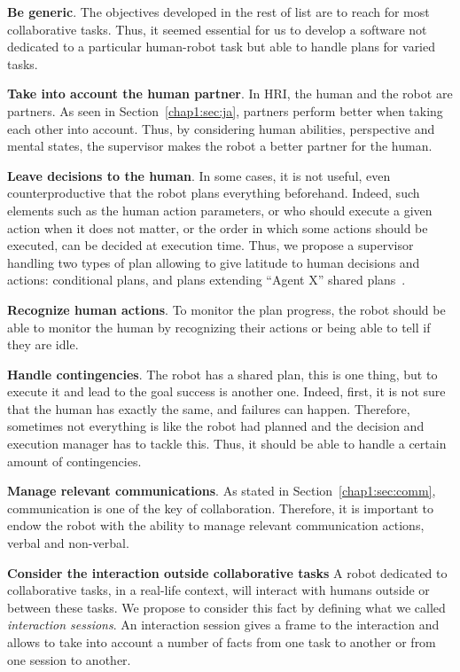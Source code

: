 \documentclass[a4paper,11pt,twoside]{StyleThese}
\begin{document}
\begin{bulletList}
	\item \textbf{Be generic}. The objectives developed in the rest of list are to reach for most collaborative tasks. Thus, it seemed essential for us to develop a software not dedicated to a particular human-robot task but able to handle plans for varied tasks. 
	\item \textbf{Take into account the human partner}. In HRI, the human and the robot are partners. As seen in Section~\ref{chap1:sec:ja}, partners perform better when taking each other into account. Thus, by considering human abilities, perspective and mental states, the supervisor makes the robot a better partner for the human.
	\item \textbf{Leave decisions to the human}. In some cases, it is not useful, even counterproductive that the robot plans everything beforehand. Indeed, such elements such as the human action parameters, or who should execute a given action when it does not matter, or the order in which some actions should be executed, can be decided at execution time. Thus, we propose a supervisor handling two types of plan allowing to give latitude to human decisions and actions: conditional plans, and plans extending ``Agent X'' shared plans~\cite{devin_2017_decisions}.
	\item \textbf{Recognize human actions}. To monitor the plan progress, the robot should be able to monitor the human by recognizing their actions or being able to tell if they are idle.
	\item \textbf{Handle contingencies}. The robot has a shared plan, this is one thing, but to execute it and lead to the goal success is another one. Indeed, first, it is not sure that the human has exactly the same, and failures can happen. Therefore, sometimes not everything is like the robot had planned and the decision and execution manager has to tackle this. Thus, it should be able to handle a certain amount of contingencies.
	\item \textbf{Manage relevant communications}. As stated in Section~\ref{chap1:sec:comm}, communication is one of the key of collaboration. Therefore, it is important to endow the robot with the ability to manage relevant communication actions, verbal and non-verbal.
	\item \textbf{Consider the interaction outside collaborative tasks} A robot dedicated to collaborative tasks, in a real-life context, will interact with humans outside or between these tasks. We propose to consider this fact by defining what we called \textit{interaction sessions}. An interaction session gives a frame to the interaction and allows to take into account a number of facts from one task to another or from one session to another.

\end{bulletList}
\end{document}
